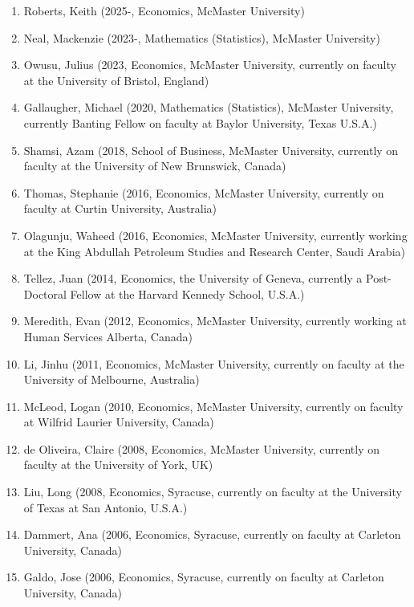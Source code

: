 \documentclass[
]{article}
\begin{document}
\begin{itemize}
  \begin{enumerate}
  \def\labelenumi{\arabic{enumi}.}
  \item
    Roberts, Keith (2025-, Economics, McMaster University)
  \item
    Neal, Mackenzie (2023-, Mathematics (Statistics), McMaster
    University)
  \item
    Owusu, Julius (2023, Economics, McMaster University, currently on
    faculty at the University of Bristol, England)
  \item
    Gallaugher, Michael (2020, Mathematics (Statistics), McMaster
    University, currently Banting Fellow on faculty at Baylor
    University, Texas U.S.A.)
  \item
    Shamsi, Azam (2018, School of Business, McMaster University,
    currently on faculty at the University of New Brunswick, Canada)
  \item
    Thomas, Stephanie (2016, Economics, McMaster University, currently
    on faculty at Curtin University, Australia)
  \item
    Olagunju, Waheed (2016, Economics, McMaster University, currently
    working at the King Abdullah Petroleum Studies and Research Center,
    Saudi Arabia)
  \item
    Tellez, Juan (2014, Economics, the University of Geneva, currently a
    Post-Doctoral Fellow at the Harvard Kennedy School, U.S.A.)
  \item
    Meredith, Evan (2012, Economics, McMaster University, currently
    working at Human Services Alberta, Canada)
  \item
    Li, Jinhu (2011, Economics, McMaster University, currently on
    faculty at the University of Melbourne, Australia)
  \item
    McLeod, Logan (2010, Economics, McMaster University, currently on
    faculty at Wilfrid Laurier University, Canada)
  \item
    de Oliveira, Claire (2008, Economics, McMaster University, currently
    on faculty at the University of York, UK)
  \item
    Liu, Long (2008, Economics, Syracuse, currently on faculty at the
    University of Texas at San Antonio, U.S.A.)
  \item
    Dammert, Ana (2006, Economics, Syracuse, currently on faculty at
    Carleton University, Canada)
  \item
    Galdo, Jose (2006, Economics, Syracuse, currently on faculty at
    Carleton University, Canada)


\end{enumerate}
\end{itemize}
\end{document}

